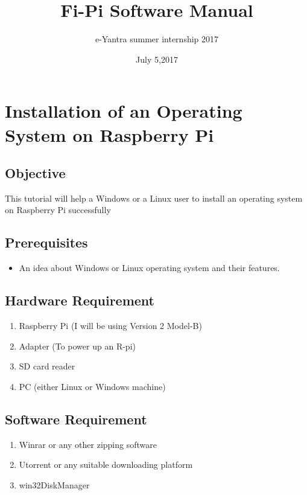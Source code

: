\documentclass[11pt,a4paper]{report}
\title{Fi-Pi Software Manual }
\author{e-Yantra summer internship 2017}
\date{July 5,2017}
\begin{document}
	\maketitle
	\newpage
	\tableofcontents{}
	\newpage
	
	\chapter{Installation of an Operating System on Raspberry Pi}
	\section{Objective}
	\begin{flushleft}
	 This tutorial will help a Windows or a Linux user to install an operating system on Raspberry Pi successfully
	\end{flushleft}
	\section{Prerequisites}
	\begin{itemize}
		\item An idea about Windows or Linux operating system and their features.
	\end{itemize}
	\section{Hardware Requirement}
	\begin{enumerate}
		\item Raspberry Pi (I will be using Version 2 Model-B)
		\item Adapter (To power up an R-pi)
		\item SD card reader
		\item PC (either Linux or Windows machine)
	\end{enumerate}
	\section{Software Requirement}
	\begin{enumerate}
		\item Winrar or any other zipping software 
		\item Utorrent or any suitable downloading platform	
		\item win32DiskManager
	\end{enumerate}
	\newpage
\end{document}
